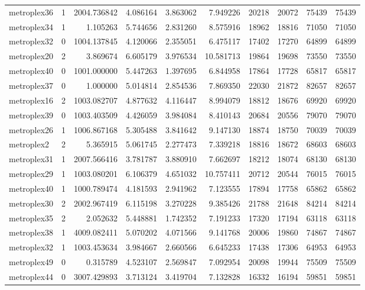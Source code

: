\begin{longtable}{|l|r|r|r|r|r|r|r|r|r|}
metroplex36 & 1 & 2004.736842 & 4.086164 & 3.863062 & 7.949226 & 20218 & 20072 & 75439 & 75439 \\
metroplex34 & 1 & 1.105263 & 5.744656 & 2.831260 & 8.575916 & 18962 & 18816 & 71050 & 71050 \\
metroplex32 & 0 & 1004.137845 & 4.120066 & 2.355051 & 6.475117 & 17402 & 17270 & 64899 & 64899 \\
metroplex20 & 2 & 3.869674 & 6.605179 & 3.976534 & 10.581713 & 19864 & 19698 & 73550 & 73550 \\
metroplex40 & 0 & 1001.000000 & 5.447263 & 1.397695 & 6.844958 & 17864 & 17728 & 65817 & 65817 \\
metroplex37 & 0 & 1.000000 & 5.014814 & 2.854536 & 7.869350 & 22030 & 21872 & 82657 & 82657 \\
metroplex16 & 2 & 1003.082707 & 4.877632 & 4.116447 & 8.994079 & 18812 & 18676 & 69920 & 69920 \\
metroplex39 & 0 & 1003.403509 & 4.426059 & 3.984084 & 8.410143 & 20684 & 20556 & 79070 & 79070 \\
metroplex26 & 1 & 1006.867168 & 5.305488 & 3.841642 & 9.147130 & 18874 & 18750 & 70039 & 70039 \\
metroplex2 & 2 & 5.365915 & 5.061745 & 2.277473 & 7.339218 & 18816 & 18672 & 68603 & 68603 \\
metroplex31 & 1 & 2007.566416 & 3.781787 & 3.880910 & 7.662697 & 18212 & 18074 & 68130 & 68130 \\
metroplex29 & 1 & 1003.080201 & 6.106379 & 4.651032 & 10.757411 & 20712 & 20544 & 76015 & 76015 \\
metroplex40 & 1 & 1000.789474 & 4.181593 & 2.941962 & 7.123555 & 17894 & 17758 & 65862 & 65862 \\
metroplex30 & 2 & 2002.967419 & 6.115198 & 3.270228 & 9.385426 & 21788 & 21648 & 84214 & 84214 \\
metroplex35 & 2 & 2.052632 & 5.448881 & 1.742352 & 7.191233 & 17320 & 17194 & 63118 & 63118 \\
metroplex38 & 1 & 4009.082411 & 5.070202 & 4.071566 & 9.141768 & 20006 & 19860 & 74867 & 74867 \\
metroplex32 & 1 & 1003.453634 & 3.984667 & 2.660566 & 6.645233 & 17438 & 17306 & 64953 & 64953 \\
metroplex49 & 0 & 0.315789 & 4.523107 & 2.569847 & 7.092954 & 20098 & 19944 & 75509 & 75509 \\
metroplex44 & 0 & 3007.429893 & 3.713124 & 3.419704 & 7.132828 & 16332 & 16194 & 59851 & 59851 \\

\end{longtable}
